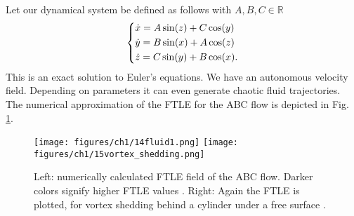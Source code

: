 
\begin{ex}
	Let our dynamical system be defined as follows with $A,B,C \in \mathbb{R}$
\begin{align}
	\begin{dcases}
		\dot{x} = A \sin(z) + C \cos(y) \\
		\dot{y} = B \sin(x) + A \cos(z) \\
		\dot{z} = C \sin(y) + B \cos(x).
	\end{dcases}
\end{align}
This is an exact solution to Euler's equations.  We have an autonomous velocity field. Depending on parameters it can even generate chaotic fluid trajectories. The numerical approximation of the FTLE for the ABC flow is depicted in Fig. \ref{fig:FTLE_flows}.
\begin{figure}[h!]
	\centering
	\texttt{[image: figures/ch1/14fluid1.png]}
	\hspace{0.03\textwidth}
	\texttt{[image: figures/ch1/15vortex\_shedding.png]}
	\caption{Left: numerically calculated FTLE field of the ABC flow. Darker colors signify higher FTLE values \cite{Haller2001}. Right: Again the FTLE is plotted, for vortex shedding behind a cylinder under a free surface \cite{Sun2016}.}
	\label{fig:FTLE_flows}
\end{figure}
\end{ex}
